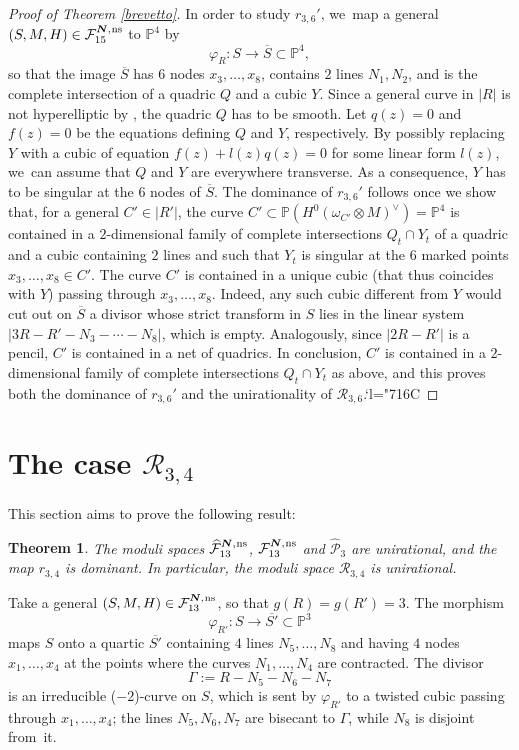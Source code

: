 \documentclass[JEP,XML,SOM,Unicode,NoEqCountersInSection,published]{cedram}
\newcommand{\Changelback}{\mathcode`l="716C}
\newcommand{\ns}{{\mkern1mu\mathrm{ns}}}
\newcommand{\bN}{\boldsymbol{N}}
\theoremstyle{plain}
\newtheorem{thm}{Theorem}[section]
\theoremstyle{definition}
\newcommand\PP{{\mathbb P}}
\newcommand\F{{\mathcal F}}
\renewcommand\P{{\mathcal P}}
\newcommand\R{{\mathcal R}}
\begin{document}
\begin{proof}[Proof of Theorem \ref{brevetto}]
In order to study $r_{3,6}'$, we~map a general $(S,M,H)\in \F_{15}^{\bN,\ns}$ to $\PP^4$ by
\[
\varphi_{R}:S\to \overline{S}\subset \mathbb P^4,
\]
so that the image $\overline{S}$ has $6$ nodes $x_3,\ldots, x_8$, contains $2$ lines $N_1,N_2$, and is the complete intersection of a quadric $Q$ and a cubic $Y$. Since a general curve in $|R|$ is not hyperelliptic by \cite[Prop.\,5.6]{DL}, the quadric $Q$ has to be smooth. Let $q(z)=0$ and $f(z)=0$ be the equations defining $Q$ and $Y$, respectively. By possibly replacing $Y$ with a cubic of equation $f(z)+l(z)q(z)=0$ for some linear form $l(z)$, we~can assume that $Q$ and $Y$ are everywhere transverse. As a consequence, $Y$ has to be singular at the $6$ nodes of $\overline{S}$. The dominance of $r_{3,6}'$ follows once we show that, for a general $C'\in |R'|$, the curve $C'\subset \PP(H^0(\omega_{C'}\otimes M)^\vee)=\PP^4$ is contained in a $2$-dimensional family of complete intersections $Q_t\cap Y_t$ of a quadric and a cubic containing $2$ lines and such that $Y_t$ is singular at the $6$ marked points $x_3,\ldots,x_8\in C'$. The curve $C'$ is contained in a unique cubic (that thus coincides with $Y$) passing through $x_3,\ldots, x_8$. Indeed, any such cubic different from $Y$ would cut out on $\overline{S}$ a divisor whose strict transform in $S$ lies in the linear system $|3R-R'-N_3-\cdots-N_8|$, which is empty. Analogously, since
$|2R-R'|$ is a pencil, $C'$ is contained in a net of quadrics. In conclusion, $C'$ is contained in a $2$-dimensional family of complete intersections $Q_t\cap Y_t$ as above, and this proves both the dominance of $r_{3,6}'$ and the unirationality of $\R_{3,6}$.\Changelback
\end{proof}

\section{The case \texorpdfstring{$\R_{3,4}$}{R}}

This section aims to prove the following result:

\begin{thm}\label{ale}
The moduli spaces $\widehat{\F}_{13}^{\bN,\ns}$, $\F_{13}^{\bN,\ns}$ and $\widehat\P_{3}$ are unirational, and the map $r_{3,4}$ is dominant. In particular, the moduli space $\R_{3,4}$ is unirational.
\end{thm}
Take a general $(S,M,H)\in \F_{13}^{\bN,\ns}$, so that $g(R)=g(R')=3$. The morphism
\[
\varphi_{R'}:S\to \overline{S'}\subset\PP^3
\]
maps $S$ onto a quartic $\overline{S'}$ containing $4$ lines $N_5,\ldots,N_8$ and having $4$ nodes $x_1,\ldots,x_4$ at the points where the curves $N_1,\ldots,N_4$ are contracted. The divisor
\[
\Gamma:=R-N_5-N_6-N_7
\]
is an irreducible ($-2$)-curve on $S$, which is sent by $\varphi_{R'}$ to a twisted cubic passing through $x_1,\ldots,x_4$; the lines $N_5,N_6,N_7$
are bisecant to $\Gamma$, while $N_8$ is disjoint from~it.
\end{document}
